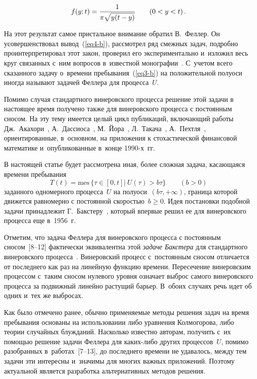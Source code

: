 \begin{multicols}{2}
\noindent
\begin{equation}
  \label{eq4-b}
  f(y;t) = \displaystyle\frac{\displaystyle 1\mathstrut}{\displaystyle \pi \sqrt{y(t-y)}\mathstrut} \qquad (0<y<t)\,.
\end{equation}

На этот результат самое пристальное внимание обратил В.~Феллер. Он усовершенствовал вывод~(\ref{eq4-b}), рассмотрел ряд смежных задач, подробно проинтерпретировал этот закон, проверил его экспериментально и~изложил весь круг связанных с~ним вопросов в~известной монографии~\cite{ref5}. С~учетом всего сказанного задачу о~времени пребывания~(\ref{eq3-b}) на положительной полуоси иногда называют задачей Феллера для процесса~$U$.

Помимо случая стандартного винеровского процесса решение этой задачи в настоящее время получено также для винеровского процесса с постоянным сносом. На эту тему имеется целый цикл публикаций, включающий работы
Дж.~Акахори~\cite{ref10}, А.~Дассиоса~\cite{ref9}, М.~Йора~\cite{ref11},  Л.~Такача~\cite{ref8}, А.~Пехт\-ля~\cite{ref12}, ориентированные, в~основном, на приложения к стохастической финансовой математике и~опубликованные в~конце 1990-х~гг.

\columnbreak

В настоящей статье будет рассмотрена иная, более сложная задача, касающаяся времени пребывания
\begin{equation*}
  T(t)=\mathrm{mes}\, \{ \tau \in [0, t]|\ U(\tau) > b \tau \} \qquad (b > 0)
\end{equation*}
заданного одномерного процесса~$U$ на полуоси~$(b \tau, +\infty)$, граница которой движется равномерно с постоянной скоростью~$b \geqslant 0$. Идея постановки подобной задачи принадлежит Г.~Бакстеру~\cite{ref13}, который впервые решил ее для винеровского процесса еще в~1956~г.

Отметим, что задача Феллера для винеровского процесса с постоянным сносом~[8--12] фактически эквивалентна этой {\it задаче Бакстера} для стандартного винеровского процесса~\cite{ref13}. Винеровский процесс с~постоянным сносом отличается от последнего как раз на линейную функцию времени. Пересечение винеровским процессом с~таким сносом нулевого уровня означает выброс самого винеровского процесса за подвижный линейно рас\-ту\-щий барьер. В~обоих случаях речь идет об одних и~тех же выбросах.

Как было отмечено ранее, обычно применяемые методы решения задач на время пребывания основаны на использовании либо уравнения Колмогорова, либо теории случайных блужданий. Насколько известно авторам, получить с~их помощью решение задачи Феллера для ка\-ких-ли\-бо других процессов~$U$, помимо разобранных в~работах~[7--13], до последнего времени не удавалось, между тем задачи эти интересны и~значимы для многих важных приложений. Поэтому актуальной является разработка альтернативных методов решения.



\end{multicols}

